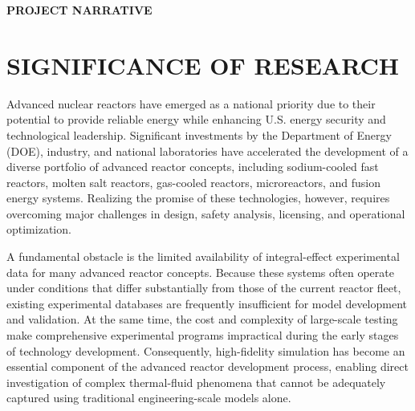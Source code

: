 

\begin{center}
{\bf PROJECT NARRATIVE}
\end{center}
\vspace{-.15in}

\vspace{-.25in}
\section*{SIGNIFICANCE OF RESEARCH}
\vspace{-.2in}

Advanced nuclear reactors have emerged as a national priority due to their potential to provide reliable energy while enhancing U.S. energy security and technological leadership. Significant investments by the Department of Energy (DOE), industry, and national laboratories have accelerated the development of a diverse portfolio of advanced reactor concepts, including sodium-cooled fast reactors, molten salt reactors, gas-cooled reactors, microreactors, and fusion energy systems. Realizing the promise of these technologies, however, requires overcoming major challenges in design, safety analysis, licensing, and operational optimization.

A fundamental obstacle is the limited availability of integral-effect experimental data for many advanced reactor concepts. Because these systems often operate under conditions that differ substantially from those of the current reactor fleet, existing experimental databases are frequently insufficient for model development and validation. At the same time, the cost and complexity of large-scale testing make comprehensive experimental programs impractical during the early stages of technology development. Consequently, high-fidelity simulation has become an essential component of the advanced reactor development process, enabling direct investigation of complex thermal-fluid phenomena that cannot be adequately captured using traditional engineering-scale models alone.

